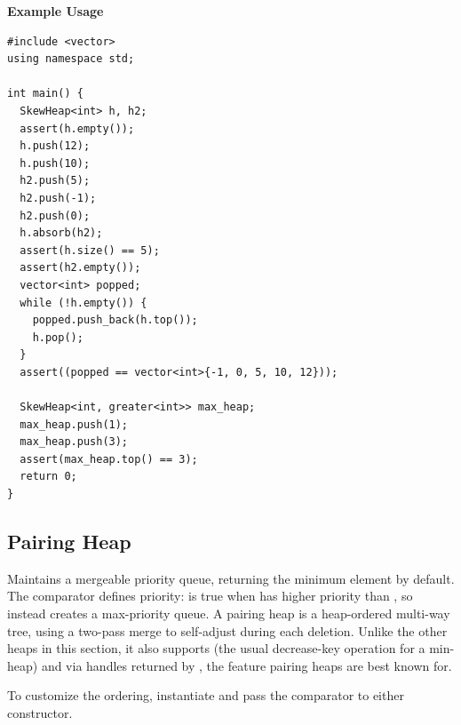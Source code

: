 \textbf{Example Usage}\par
\begin{lstlisting}[style=cpp]
#include <vector>
using namespace std;

int main() {
  SkewHeap<int> h, h2;
  assert(h.empty());
  h.push(12);
  h.push(10);
  h2.push(5);
  h2.push(-1);
  h2.push(0);
  h.absorb(h2);
  assert(h.size() == 5);
  assert(h2.empty());
  vector<int> popped;
  while (!h.empty()) {
    popped.push_back(h.top());
    h.pop();
  }
  assert((popped == vector<int>{-1, 0, 5, 10, 12}));

  SkewHeap<int, greater<int>> max_heap;
  max_heap.push(1);
  max_heap.push(3);
  assert(max_heap.top() == 3);
  return 0;
}
\end{lstlisting}
\subsection{Pairing Heap}
\label{sec:2.3.4}
Maintains a mergeable priority queue, returning the minimum element by default. The comparator  defines priority:  is true when  has higher priority than , so  instead creates a max-priority queue. A pairing heap is a heap-ordered multi-way tree, using a two-pass merge to self-adjust during each deletion. Unlike the other heaps in this section, it also supports  (the usual decrease-key operation for a min-heap) and  via handles returned by , the feature pairing heaps are best known for.

To customize the ordering, instantiate  and pass the comparator to either constructor.

